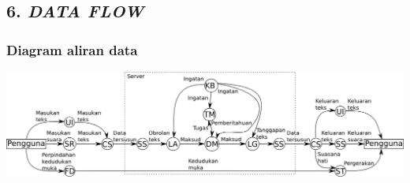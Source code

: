 \subsection*{\textcolor{subsectioncolor}{\textsf{6. \textit{DATA FLOW}}}}

\subsubsection*{Diagram aliran data}
\includegraphics[width=1.0\textwidth]{DiagramAliranData}
